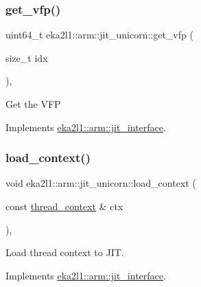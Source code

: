 \subsubsection{\texorpdfstring{get\+\_\+vfp()}{get\_vfp()}}
{\footnotesize\ttfamily uint64\+\_\+t eka2l1\+::arm\+::jit\+\_\+unicorn\+::get\+\_\+vfp (\begin{DoxyParamCaption}\item[{size\+\_\+t}]{idx }\end{DoxyParamCaption})\hspace{0.3cm}{\ttfamily [override]}, {\ttfamily [virtual]}}

Get the V\+FP 

Implements \mbox{\hyperlink{classeka2l1_1_1arm_1_1jit__interface_a30925206698ca8a6fc7d86ec73886d06}{eka2l1\+::arm\+::jit\+\_\+interface}}.

\mbox{\label{classeka2l1_1_1arm_1_1jit__unicorn_a54d69d4246e4c22e06b3d4b2b43d9872}} 
\subsubsection{\texorpdfstring{load\+\_\+context()}{load\_context()}}
{\footnotesize\ttfamily void eka2l1\+::arm\+::jit\+\_\+unicorn\+::load\+\_\+context (\begin{DoxyParamCaption}\item[{const \mbox{\hyperlink{structeka2l1_1_1arm_1_1jit__interface_1_1thread__context}{thread\+\_\+context}} \&}]{ctx }\end{DoxyParamCaption})\hspace{0.3cm}{\ttfamily [override]}, {\ttfamily [virtual]}}

Load thread context to J\+IT. 

Implements \mbox{\hyperlink{classeka2l1_1_1arm_1_1jit__interface_acdb436ffc407767efaec732b619caf04}{eka2l1\+::arm\+::jit\+\_\+interface}}.

\mbox{\label{classeka2l1_1_1arm_1_1jit__unicorn_a98e8406378258c67449780280d839ac3}} 
